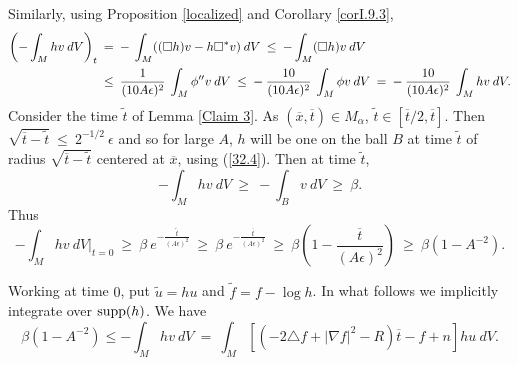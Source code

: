 Similarly, using Proposition \ref{localized} and Corollary \ref{corI.9.3},
\begin{align}
\left(- \int_M hv \: dV \right)_t \: & = \: - \: \int_M
((\square h) v - h \square^* v) \: dV \: \le \: - \int_M (\square h) v
\: dV \\
& \le \:
\frac{1}{(10A\epsilon)^2} \: \int_M \phi^{\prime \prime} v \: dV \: \le \: - \:
\frac{10}{(10A\epsilon)^2} \: \int_M \phi v \: dV \: = \: - \:
\frac{10}{(10A\epsilon)^2} \: \int_M h v \: dV. \notag
\end{align}
Consider the time $\widetilde{t}$ of Lemma \ref{Claim 3}. As
$(\overline{x}, \overline{t}) \in M_\alpha$,
$\widetilde{t} \in
[\overline{t}/2, \overline{t}]$. Then $\sqrt{\overline{t} -
\widetilde{t}} \: \le \: 2^{-1/2} \: \epsilon$ and so for large $A$,
$h$ will be one on the ball $B$
at time $\widetilde{t}$ of radius $\sqrt{\overline{t} -
\widetilde{t}}$ centered at $\overline{x}$, using
(\ref{32.4}). Then at time $\widetilde{t}$,
\begin{equation}
- \int_M hv \: dV \: \ge \: - \int_B v \: dV \: \ge \: \beta.
\end{equation}
Thus
\begin{equation}
- \int_M hv \: dV \Big|_{t=0} \: \ge \: \beta \: e^{-
\frac{\widetilde{t}}{(A\epsilon)^2}} \: \ge \:
\beta \: e^{- \frac{\overline{t}}{(A\epsilon)^2}} \: \ge \: \beta
\left( 1 - \frac{\overline{t}}{(A \epsilon)^2} \right)
\: \ge \: \beta (1 - A^{-2}).
\end{equation}

Working at time $0$, put $\widetilde{u} = hu$ and
$\widetilde{f} = f - \log h$.
In what follows we implicitly integrate over $\operatorname{supp}(h)$.
We have
\begin{equation}
\beta (1 - A^{-2}) \le - \int_M hv \: dV \: = \:
\int_M [(-2\triangle f + |\nabla f|^2 - R) \overline{t}
- f + n]hu \: dV.
\end{equation}

